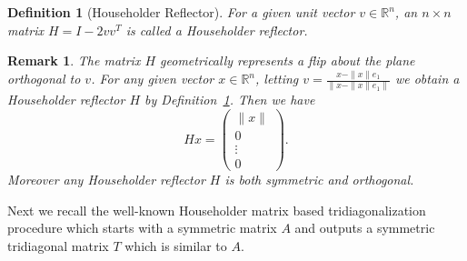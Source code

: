\documentclass{amsart}
\newtheorem{defn}[thm]{Definition}
\newtheorem{rmk}[thm]{Remark}
\numberwithin{equation}{section}
\begin{document}
\begin{defn}[Householder Reflector]\label{def:householder}
For a given unit vector $v\in \mathbb{R}^n$, an $n\times n$ matrix $H = I - 2vv^T$ is called a Householder reflector. 
\end{defn}

\begin{rmk}
The matrix $H$ geometrically represents a flip about the plane orthogonal to $v$. For any given vector $x\in \mathbb{R}^n$, letting $v = \frac{x - \|x\| e_1}{\|x - \|x\|e_1\|}$ we obtain a Householder reflector $H$ by Definition~\ref{def:householder}. Then we have
\begin{equation*}
    H x = \begin{pmatrix} \|x\| \\ 0 \\ \vdots \\ 0\end{pmatrix}.
\end{equation*}
Moreover any Householder reflector $H$ is both symmetric and orthogonal. 
\end{rmk}


Next we recall the well-known Householder matrix based tridiagonalization procedure which starts with a symmetric matrix $A$ and outputs a symmetric tridiagonal matrix $T$ which is similar to $A$. 
\end{document}
